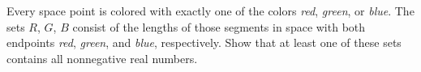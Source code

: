 Every space point is colored with exactly one of the colors \emph{red}, \emph{green}, or \emph{blue}. The sets $R$, $G$, $B$ consist of the lengths of those segments in space with both endpoints \emph{red}, \emph{green}, and \emph{blue}, respectively. Show that at least one of these sets contains all nonnegative real numbers.
